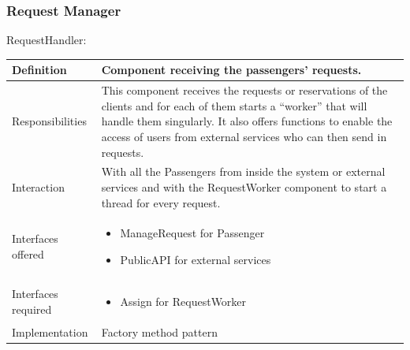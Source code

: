 \documentclass[a4paper,11pt]{report} %
\begin{document}
	\subsubsection{Request Manager}
	\begin{minipage}{\linewidth}
	\end{minipage} \linebreak
	\centerline{RequestHandler:}
	\begin{center}
		\begin{tabular}{| l | p{9cm} |}\hline
			Definition & Component receiving the passengers' requests.\\\hline
			Responsibilities & This component receives the requests or reservations of the clients and for each of them starts a ``worker'' that will handle them singularly. It also offers functions to enable the access of users from external services who can then send in requests.\\\hline
			Interaction & With all the Passengers from inside the system or external services and with the RequestWorker component to start a thread for every request.\\\hline
			Interfaces offered & \begin{itemize}
				\item ManageRequest for Passenger
				\item PublicAPI for external services
			\end{itemize}\\\hline
			Interfaces required & \begin{itemize}
				\item Assign for RequestWorker
			\end{itemize}\\\hline
			Implementation & Factory method pattern\\\hline
		\end{tabular}
	\end{center}
	
\end{document}
